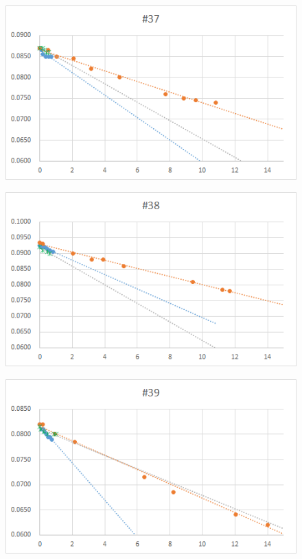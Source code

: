   \begin{figure}[htbp]
    \centering
       \includegraphics[width=120mm]{vol_037.png}
  \end{figure}
  \begin{figure}[htbp]
    \centering
       \includegraphics[width=120mm]{vol_038.png}
  \end{figure}
  \begin{figure}[htbp]
    \centering
       \includegraphics[width=120mm]{vol_039.png}
  \end{figure}
